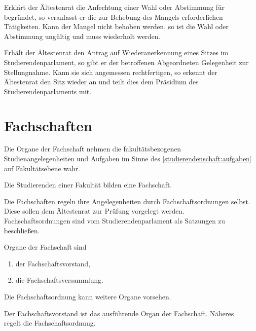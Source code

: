 \begin{contract}
Erklärt der Ältestenrat die Anfechtung einer Wahl oder Abstimmung für begründet, so veranlasst er die zur Behebung des Mangels erforderlichen Tätigkeiten. Kann der Mangel nicht behoben werden, so ist die Wahl oder Abstimmung ungültig und muss wiederholt werden. 

Erhält der Ältestenrat den Antrag auf Wiederanerkennung eines Sitzes im Studierendenparlament, so gibt er der betroffenen Abgeordneten Gelegenheit zur Stellungnahme. Kann sie sich angemessen rechtfertigen, so erkennt der Ältestenrat den Sitz wieder an und teilt dies dem Präsidium des Studierendenparlaments mit.


%
%

\parnumberfalse \section{Fachschaften} \parnumbertrue

 \label{fachschaften:aufgaben}

\parnumberfalse Die Organe der Fachschaft nehmen die fakultätsbezogenen Studienangelegenheiten und Aufgaben im Sinne des \ref{studierendenschaft:aufgaben} auf Fakultätsebene wahr. \parnumbertrue

\label{fachschaften:gliederung}

Die Studierenden einer Fakultät bilden eine Fachschaft. 

Die Fachschaften regeln ihre Angelegenheiten durch Fachschaftsordnungen selbst. Diese sollen dem Ältestenrat zur Prüfung vorgelegt werden. Fachschaftsordnungen sind vom Studierendenparlament als Satzungen zu beschließen.



Organe der Fachschaft sind
  \begin{enumerate}
  \item der Fachschaftsvorstand,
  \item die Fachschaftsversammlung.
  \end{enumerate}

Die Fachschaftsordnung kann weitere Organe vorsehen.


\label{fs:vorstand}

Der Fachschaftsvorstand ist das ausführende Organ der Fachschaft. Näheres regelt die Fachschaftsordnung.


\end{contract}
